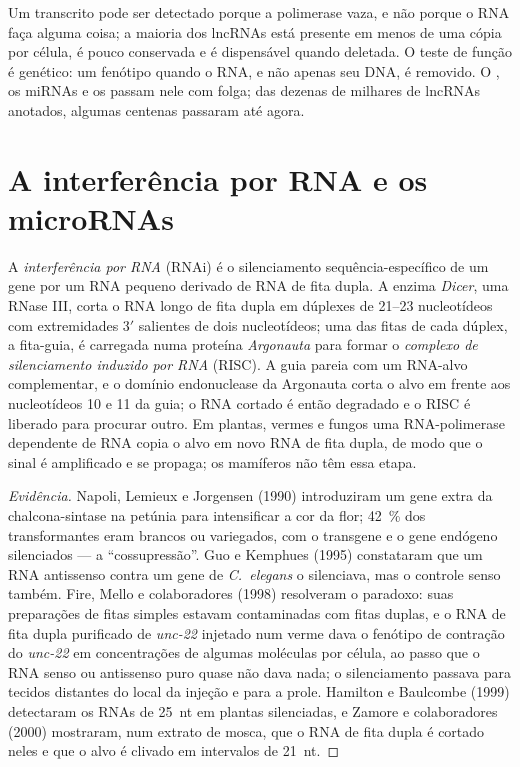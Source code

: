 \begin{remark}\label{rem:b3:rna-regulation:function}
Um transcrito pode ser detectado porque a polimerase vaza, e não
porque o RNA faça alguma coisa; a maioria dos lncRNAs está presente em
menos de uma cópia por célula, é pouco conservada e é dispensável
quando deletada. O teste de função é genético: um fenótipo quando o
RNA, e não apenas seu DNA, é removido. O \emph{}, os miRNAs e os
 passam nele com folga; das dezenas de milhares de lncRNAs
anotados, algumas centenas passaram até agora.
\end{remark}

\section{A interferência por RNA e os microRNAs}

\begin{definition}\label{def:b3:rna-regulation:rnai}
A \emph{interferência por RNA} (RNAi) é o silenciamento
sequência-específico de um gene por um RNA pequeno derivado de RNA de
fita dupla. A enzima \emph{Dicer}, uma RNase III, corta o RNA longo de
fita dupla em dúplexes de \numrange{21}{23} nucleotídeos com
extremidades 3$'$ salientes de dois nucleotídeos; uma das fitas de
cada dúplex, a fita-guia, é carregada numa proteína \emph{Argonauta}
para formar o \emph{complexo de silenciamento induzido por RNA}
(RISC). A guia pareia com um RNA-alvo complementar, e o domínio
endonuclease da Argonauta corta o alvo em frente aos nucleotídeos 10 e
11 da guia; o RNA cortado é então degradado e o RISC é liberado para
procurar outro. Em plantas, vermes e fungos uma RNA-polimerase
dependente de RNA copia o alvo em novo RNA de fita dupla, de modo que
o sinal é amplificado e se propaga; os mamíferos não têm essa etapa.
\end{definition}

\begin{proof}[Evidência]
Napoli, Lemieux e Jorgensen (1990) introduziram um gene extra da
chalcona-sintase na petúnia para intensificar a cor da flor;
\qty{42}{\%} dos transformantes eram brancos ou variegados, com o
transgene e o gene endógeno silenciados --- a ``cossupressão''. Guo e
Kemphues (1995) constataram que um RNA antissenso contra um gene de
\emph{C.~elegans} o silenciava, mas o controle senso também. Fire,
Mello e colaboradores (1998) resolveram o paradoxo: suas preparações
de fitas simples estavam contaminadas com fitas duplas, e o RNA de
fita dupla purificado de \emph{unc-22} injetado num verme dava o
fenótipo de contração do \emph{unc-22} em concentrações de algumas
moléculas por célula, ao passo que o RNA senso ou antissenso puro
quase não dava nada; o silenciamento passava para tecidos distantes do
local da injeção e para a prole. Hamilton e Baulcombe (1999)
detectaram os RNAs de \qty{25}{nt} em plantas silenciadas, e Zamore e
colaboradores (2000) mostraram, num extrato de mosca, que o RNA de
fita dupla é cortado neles e que o alvo é clivado em intervalos de
\qty{21}{nt}.
\end{proof}

